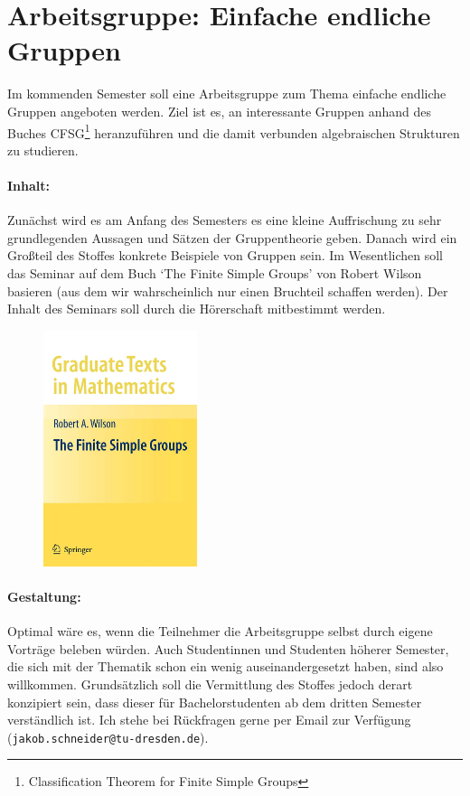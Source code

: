 \documentclass{article}
\begin{document}
\section*{Arbeitsgruppe: Einfache endliche Gruppen}

Im kommenden Semester soll eine Arbeitsgruppe zum Thema einfache endliche Gruppen angeboten werden. Ziel ist es, an interessante Gruppen anhand des Buches CFSG\footnote{Classification Theorem for Finite Simple Groups} heranzuführen und die damit verbunden algebraischen Strukturen zu studieren.

\paragraph{Inhalt:}
Zunächst wird es am Anfang des Semesters es eine kleine Auffrischung zu sehr grundlegenden Aussagen und Sätzen der Gruppentheorie geben.
Danach wird ein Großteil des Stoffes konkrete Beispiele von Gruppen sein. Im Wesentlichen soll das Seminar auf dem Buch `The Finite Simple Groups' von Robert Wilson
basieren (aus dem wir wahrscheinlich nur einen Bruchteil schaffen werden). Der Inhalt des Seminars soll durch die Hörerschaft mitbestimmt werden.

\begin{figure}[htb]
   \centering
   \includegraphics[width=0.4\textwidth]{FSG.jpg}
\end{figure}

\paragraph{Gestaltung:} Optimal wäre es, wenn die Teilnehmer die Arbeitsgruppe selbst durch eigene Vorträge beleben würden.
Auch Studentinnen und Studenten höherer Semester, die sich mit der Thematik schon ein wenig auseinandergesetzt haben, sind also willkommen.
Grundsätzlich soll die Vermittlung des Stoffes jedoch derart konzipiert sein, dass dieser für Bachelorstudenten ab dem dritten Semester verständlich ist.
Ich stehe bei Rückfragen gerne per Email zur Verfügung ({\tt jakob.schneider@tu-dresden.de}).
\end{document}
